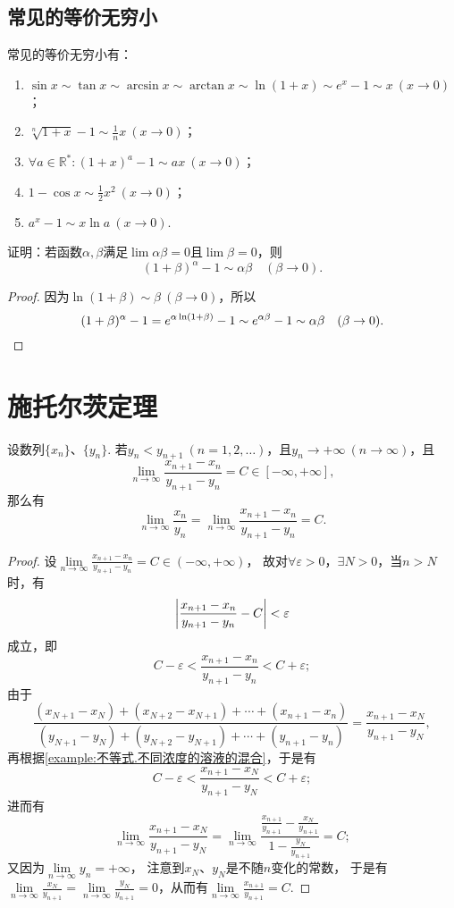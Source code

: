 \subsection{常见的等价无穷小}
常见的等价无穷小有：
\begin{enumerate}
\item \(\sin x \sim \tan x \sim \arcsin x \sim \arctan x \sim \ln(1+x) \sim e^x-1 \sim x\ (x\to0)\)；
\item \(\sqrt[n]{1+x} - 1 \sim \frac{1}{n} x\ (x\to0)\)；
\item \(\forall a\in\mathbb{R}^*: (1+x)^a-1 \sim ax\ (x\to0)\)；
\item \(1 - \cos x \sim \frac{1}{2} x^2\ (x\to0)\)；
\item \(a^x - 1 \sim x \ln a\ (x\to0)\).
\end{enumerate}

\begin{example}
证明：若函数\(\alpha,\beta\)满足\(\lim \alpha\beta = 0\)且\(\lim \beta = 0\)，则\[
(1+\beta)^{\alpha} - 1 \sim \alpha\beta \quad(\beta\to0).
\]
\begin{proof}
因为\(\ln(1+\beta) \sim \beta\ (\beta\to0)\)，所以\[
(1+\beta)^{\alpha} - 1
= e^{\alpha \ln(1+\beta)} - 1
\sim e^{\alpha\beta} - 1
\sim \alpha\beta
\quad(\beta\to0).
\qedhere
\]
\end{proof}
\end{example}

\section{施托尔茨定理}

\begin{theorem}[施托尔茨定理I]\label{theorem:极限.施托尔茨定理1}
设数列\(\{x_n\}\)、\(\{y_n\}\).
若\(y_n < y_{n+1}\ (n=1,2,\dotsc)\)，且\(y_n \to +\infty\ (n\to\infty)\)，且\[
\lim\limits_{n\to\infty} \frac{x_{n+1}-x_n}{y_{n+1}-y_n} = C\in[-\infty,+\infty],
\]那么有\[
\lim\limits_{n\to\infty} \frac{x_n}{y_n}
= \lim\limits_{n\to\infty} \frac{x_{n+1}-x_n}{y_{n+1}-y_n}
= C.
\]
\begin{proof}%
设\(\lim\limits_{n\to\infty} \frac{x_{n+1}-x_n}{y_{n+1}-y_n} = C\in(-\infty,+\infty)\)，
故对\(\forall\varepsilon>0\)，\(\exists N>0\)，当\(n > N\)时，有\[
\abs{\frac{x_{n+1}-x_n}{y_{n+1}-y_n} - C} < \varepsilon
\]成立，即\[
C - \varepsilon < \frac{x_{n+1}-x_n}{y_{n+1}-y_n} < C + \varepsilon;
\]
由于\[
\frac{
(x_{N+1}-x_N)
+ (x_{N+2}-x_{N+1})
+ \dotsb
+ (x_{n+1}-x_n)
}{
(y_{N+1}-y_N)
+ (y_{N+2}-y_{N+1})
+ \dotsb
+ (y_{n+1}-y_n)
}
= \frac{x_{n+1}-x_N}{y_{n+1}-y_N},
\]再根据\cref{example:不等式.不同浓度的溶液的混合}，于是有\[
C - \varepsilon <
\frac{x_{n+1}-x_N}{y_{n+1}-y_N}
< C + \varepsilon;
\]进而有\[
\lim\limits_{n\to\infty} \frac{x_{n+1}-x_N}{y_{n+1}-y_N}
= \lim\limits_{n\to\infty} \frac{\frac{x_{n+1}}{y_{n+1}}-\frac{x_N}{y_{n+1}}}{1-\frac{y_N}{y_{n+1}}}
= C;
\]又因为\(\lim\limits_{n\to\infty} y_n = +\infty\)，
注意到\(x_N\)、\(y_N\)是不随\(n\)变化的常数，
于是有\(\lim\limits_{n\to\infty} \frac{x_N}{y_{n+1}}
= \lim\limits_{n\to\infty} \frac{y_N}{y_{n+1}}
= 0\)，从而有\(\lim\limits_{n\to\infty} \frac{x_{n+1}}{y_{n+1}} = C\).
\end{proof}
\end{theorem}

